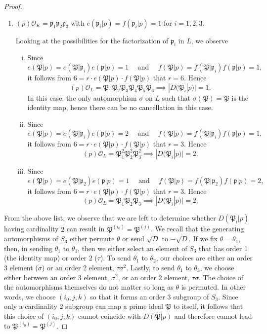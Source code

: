 \begin{proof}
\begin{enumerate}[1.]
\item $(p)\mathcal{O}_K = \mathfrak{p}_1 \mathfrak{p}_2\mathfrak{p}_3$ with $e(\mathfrak{p}_i|p) = f(\mathfrak{p}_i|p) = 1$ for $i = 1,2,3$.

Looking at the possibilities for the factorization of $\mathfrak{p}_i$ in $L$, we observe
\begin{enumerate}[i.]
\item Since 
\[e(\mathfrak{P}|p) = e(\mathfrak{P}|\mathfrak{p}_i)e(\mathfrak{p}|p) = 1 \quad \text{ and } \quad f(\mathfrak{P}|p) = f(\mathfrak{P}|\mathfrak{p}_i)f(\mathfrak{p}|p) = 1,\]
it follows from $6 = r\cdot e(\mathfrak{P}|p)\cdot f(\mathfrak{P}|p)$ that $r = 6$. Hence
\[(p)\mathcal{O}_L = \mathfrak{P}_1\mathfrak{P}_2\mathfrak{P}_3\mathfrak{P}_4\mathfrak{P}_5\mathfrak{P}_6 \implies |D(\mathfrak{P}_i|p)| = 1.\]
In this case, the only automorphism $\sigma$ on $L$ such that $\sigma(\mathfrak{P}) = \mathfrak{P}$ is the identity map, hence there can be no cancellation in this case.  
\item Since 
\[e(\mathfrak{P}|p) = e(\mathfrak{P}|\mathfrak{p}_i)e(\mathfrak{p}|p) = 2 \quad \text{ and } \quad f(\mathfrak{P}|p) = f(\mathfrak{P}|\mathfrak{p}_i)f(\mathfrak{p}|p) = 1,\]
it follows from $6 = r\cdot e(\mathfrak{P}|p)\cdot f(\mathfrak{P}|p)$ that $r = 3$. Hence
\[(p)\mathcal{O}_L = \mathfrak{P}_1^2\mathfrak{P}_2^2\mathfrak{P}_3^2 \implies |D(\mathfrak{P}_i|p)| = 2.\]
\item Since 
\[e(\mathfrak{P}|p) = e(\mathfrak{P}|\mathfrak{p}_2)e(\mathfrak{p}|p) = 1 \quad \text{ and } \quad f(\mathfrak{P}|p) = f(\mathfrak{P}|\mathfrak{p}_2)f(\mathfrak{p}|p) = 2,\]
it follows from $6 = r\cdot e(\mathfrak{P}|p)\cdot f(\mathfrak{P}|p)$ that $r = 3$. Hence
\[(p)\mathcal{O}_L = \mathfrak{P}_1\mathfrak{P}_2\mathfrak{P}_3 \implies |D(\mathfrak{P}_i|p)| = 2.\]
\end{enumerate}
\end{enumerate}

From the above list, we observe that we are left to determine whether $D(\mathfrak{P}_i|p)$ having cardinality $2$ can result in $\mathfrak{P}^{(i_0)} = \mathfrak{P}^{(j)}$. We recall that the generating automorphisms of $S_3$ either permute $\theta$ or send $\sqrt{D}$ to $-\sqrt{D}$. If we fix $\theta = \theta_1$, then, in sending $\theta_1$ to $\theta_1$, then we either select an element of $S_3$ that has order 1 (the identity map) or order $2$ ($\tau$). To send $\theta_1$ to $\theta_2$, our choices are either an order $3$ element ($\sigma$) or an order 2 element, $\tau\sigma^2$. Lastly, to send $\theta_1$ to $\theta_3$, we choose either between an order $3$ element, $\sigma^2$, or an order 2 element, $\tau\sigma$. The choice of the automorphisms themselves do not matter so long as $\theta$ is permuted. In other words, we choose $(i_0, j,k)$ so that it forms an order $3$ subgroup of $S_3$. Since only a cardinality $2$ subgroup can map a prime ideal $\mathfrak{P}$ to itself, it follows that this choice of $(i_0,j,k)$ cannot coincide with $D(\mathfrak{P}|p)$ and therefore cannot lead to $\mathfrak{P}^{(i_0)} = \mathfrak{P}^{(j)}$. 
\end{proof}

